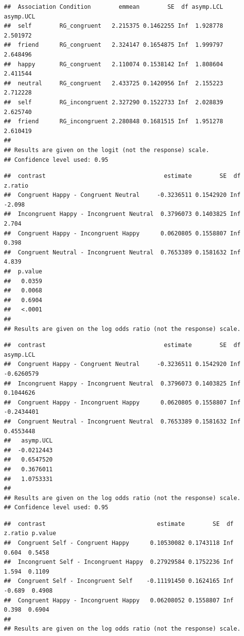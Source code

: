 \documentclass[
  man]{apa6}
\begin{document}
\begin{verbatim}
##  Association Condition        emmean        SE  df asymp.LCL asymp.UCL
##  self        RG_congruent   2.215375 0.1462255 Inf  1.928778  2.501972
##  friend      RG_congruent   2.324147 0.1654875 Inf  1.999797  2.648496
##  happy       RG_congruent   2.110074 0.1538142 Inf  1.808604  2.411544
##  neutral     RG_congruent   2.433725 0.1420956 Inf  2.155223  2.712228
##  self        RG_incongruent 2.327290 0.1522733 Inf  2.028839  2.625740
##  friend      RG_incongruent 2.280848 0.1681515 Inf  1.951278  2.610419
## 
## Results are given on the logit (not the response) scale. 
## Confidence level used: 0.95
\end{verbatim}

\begin{verbatim}
##  contrast                                  estimate        SE  df z.ratio
##  Congruent Happy - Congruent Neutral     -0.3236511 0.1542920 Inf  -2.098
##  Incongruent Happy - Incongruent Neutral  0.3796073 0.1403825 Inf   2.704
##  Congruent Happy - Incongruent Happy      0.0620805 0.1558807 Inf   0.398
##  Congruent Neutral - Incongruent Neutral  0.7653389 0.1581632 Inf   4.839
##  p.value
##   0.0359
##   0.0068
##   0.6904
##   <.0001
## 
## Results are given on the log odds ratio (not the response) scale.
\end{verbatim}

\begin{verbatim}
##  contrast                                  estimate        SE  df  asymp.LCL
##  Congruent Happy - Congruent Neutral     -0.3236511 0.1542920 Inf -0.6260579
##  Incongruent Happy - Incongruent Neutral  0.3796073 0.1403825 Inf  0.1044626
##  Congruent Happy - Incongruent Happy      0.0620805 0.1558807 Inf -0.2434401
##  Congruent Neutral - Incongruent Neutral  0.7653389 0.1581632 Inf  0.4553448
##   asymp.UCL
##  -0.0212443
##   0.6547520
##   0.3676011
##   1.0753331
## 
## Results are given on the log odds ratio (not the response) scale. 
## Confidence level used: 0.95
\end{verbatim}

\begin{verbatim}
##  contrast                                estimate        SE  df z.ratio p.value
##  Congruent Self - Congruent Happy      0.10530082 0.1743118 Inf   0.604  0.5458
##  Incongruent Self - Incongruent Happy  0.27929584 0.1752236 Inf   1.594  0.1109
##  Congruent Self - Incongruent Self    -0.11191450 0.1624165 Inf  -0.689  0.4908
##  Congruent Happy - Incongruent Happy   0.06208052 0.1558807 Inf   0.398  0.6904
## 
## Results are given on the log odds ratio (not the response) scale.
\end{verbatim}
\end{document}
